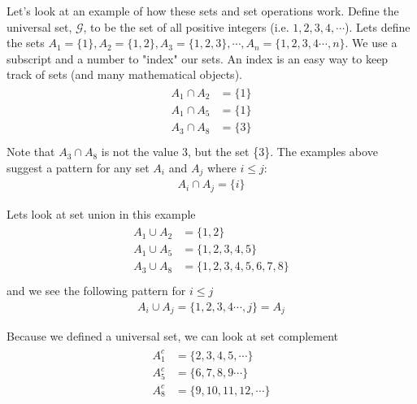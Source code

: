 \begin{VT1}

Let's look at an example of how these sets and set operations work. 
Define the universal set, $\mathcal{G}$, to be the set of all positive integers (i.e. $1,2,3,4,\cdots$). Lets define the sets $A_{1}=\{1\},A_{2}=\{1,2\},A_{3}=\{1,2,3\}, \cdots, A_{n}=\{1,2,3,4\cdots,n\} $. We use a subscript and a number to "index" our sets. 
An index is an easy way to keep track of sets (and many mathematical objects).
\begin{align}
    \begin{aligned}
        A_{1} \cap A_{2} &= \{ 1 \}\\
        A_{1} \cap A_{5} &= \{ 1 \}\\
        A_{3} \cap A_{8} &= \{ 3 \}\\
    \end{aligned}
\end{align}
Note that $A_{3} \cap A_{8}$ is not the value $3$, but the set \{3\}.
The examples above suggest a pattern for any set $A_{i}$ and $A_{j}$ where $i \leq j$:
\begin{align}
    A_{i} \cap A_{j} = \{ i \}
\end{align}

Lets look at set union in this example
\begin{align}
    \begin{aligned}
        A_{1} \cup A_{2} &= \{ 1,2 \}\\
        A_{1} \cup A_{5} &= \{ 1,2,3,4,5 \}\\
        A_{3} \cup A_{8} &= \{ 1,2,3,4,5,6,7,8 \}\\
    \end{aligned}
\end{align}
and we see the following pattern for $i \leq j$
\begin{align}
    A_{i} \cup A_{j} = \{1,2,3,4\cdots,j \} = A_{j}
\end{align}

Because we defined a universal set, we can look at set complement
\begin{align}
    \begin{aligned}
        A_{1}^{c} &= \{2,3,4,5,\cdots \}\\
        A_{5}^{c} &= \{6,7,8,9\cdots \}\\
        A_{8}^{c} &= \{9,10,11,12,\cdots \}\\
    \end{aligned}
\end{align}
\end{VT1}

